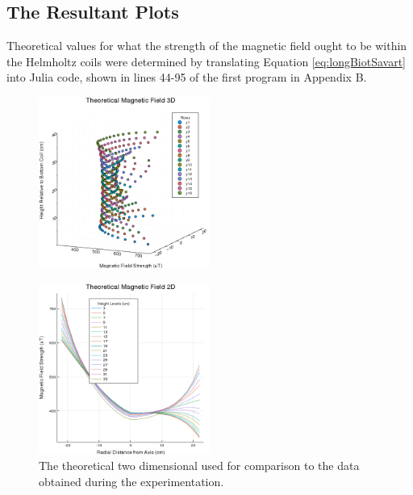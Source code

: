 \documentclass[a4paper]{article}
\begin{document}
\subsection{The Resultant Plots}
\qq Theoretical values for what the strength of the magnetic field ought to be
within the Helmholtz coils were determined by translating Equation
\ref{eq:longBiotSavart} into Julia code, shown in lines 44-95 of the first
program in Appendix B. 

\begin{figure}[H]
\centering
\includegraphics[width=0.5\textwidth]{3DPlotTheoretical.png}


\label{Theoretical 3-D plot}
\end{figure}


\begin{figure}[H]
  \begin{center}
    \includegraphics[width=0.5\textwidth]{2DPlotTheoretical.png}
  \end{center}
  \caption{The theoretical two dimensional used for comparison to the data
    obtained during the experimentation.}
  \label{Theoretical 2-D plot}

\end{figure}
\end{document}

